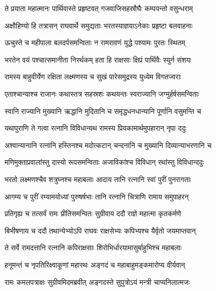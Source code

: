 
\twolineshloka
{ते प्रयाता महात्मानः पार्थिवास्ते प्रहृष्टवत्}
{गजवाजिसहस्रौघैः कम्पयन्तो वसुन्धराम्} %

\twolineshloka
{अक्षौहिण्यो हि तत्रासन् राघवार्थे समुद्यताः}
{भरतस्याज्ञयाऽनेकाः प्रहृष्टा बलवाहनाः} %

\twolineshloka
{ऊचुस्ते च महीपाला बलदर्पसमन्विताः}
{न रामरावणं युद्धे पश्यामः पुरतः स्थितम्} %

\twolineshloka
{भरतेन वयं पश्चात्समानीता निरर्थकम्}
{हता हि राक्षसाः क्षिप्रं पार्थिवैः स्युर्न संशयः} %

\twolineshloka
{रामस्य बाहुवीर्येण रक्षिता लक्ष्मणस्य च}
{सुखं पारेसमुद्रस्य युध्येम विगतज्वराः} %

\twolineshloka
{एताश्चान्याश्च राजानः कथास्तत्र सहस्रशः}
{कथयन्तः स्वराज्यानि जग्मुर्हर्षसमन्विताः} %

\twolineshloka
{स्वानि राज्यानि मुख्यानि ऋद्धानि मुदितानि च}
{समृद्धधनधान्यानि पूर्णानि वसुमन्ति च} %

\twolineshloka
{यथापुराणि ते गत्वा रत्नानि विविधान्यथ}
{रामस्य प्रियकामार्थमुपहारान् नृपा ददुः} %

\twolineshloka
{अश्वान्यानानि रत्नानि हस्तिनश्च मदोत्कटान्}
{चन्दनानि च मुख्यानि दिव्यान्याभरणानि च} %

\twolineshloka
{मणिमुक्ताप्रवालांस्तु दास्यो रूपसमन्विताः}
{अजाविकांश्च विविधान् रथांस्तु विविधान्ददुः} %

\twolineshloka
{भरतो लक्ष्मणश्चैव शत्रुघ्नश्च महाबलाः}
{आदाय तानि रत्नानि स्वां पुरीं पुनरागताः} %

\twolineshloka
{आगम्य च पुरीं रम्यामयोध्यां पुरुषर्षभाः}
{तानि रत्नानि चित्राणि रामाय समुपाहरन्} %

\twolineshloka
{प्रतिगृह्य च तत्सर्वं रामः प्रीतिसमन्वितः}
{सुग्रीवाय ददौ राज्ञे महात्मा कृतकर्मणे} %

\twolineshloka
{बिभीषणाय च ददौ तथान्येभ्योऽपि राघवः}
{राक्षसेभ्यः कपिभ्यश्च यैर्वृतो जयमाप्तवान्} %

\twolineshloka
{ते सर्वे रामदत्तानि रत्नानि कपिराक्षसाः}
{शिरोभिर्धारयामासुर्बाहुभिश्च महाबलाः} %

\twolineshloka
{हनूमन्तं च नृपतिरिक्ष्वाकूणां महारथः}
{अङ्गदं च महाबाहुमङ्कमारोप्य वीर्यवान्} %

\twolineshloka
{रामः कमलपत्राक्षः सुग्रीवमिदमब्रवीत्}
{अङ्गदस्ते सुपुत्रोऽयं मन्त्री चाप्यनिलात्मजः} %


